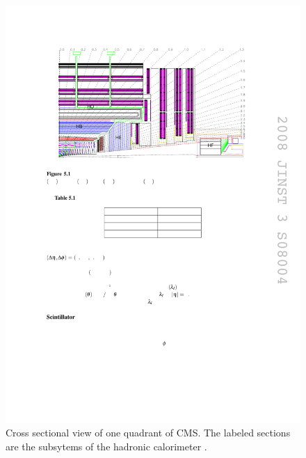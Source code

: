 \begin{figure}[tbh]
\centering
\includegraphics[width=6in]{figures/hcal.pdf}
\caption{Cross sectional view of one quadrant of CMS. The labeled sections are the subsytems of the hadronic calorimeter \cite{1748-0221-3-08-S08004}.}
\label{fig:hcal}
\end{figure}

